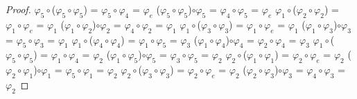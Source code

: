 \documentclass[10pt,a4paper,oneside]{article}
\begin{document}
\begin{proof}
				\newline
				$\varphi_{5}\circ$($\varphi_{5}\circ\varphi_{5}$) = $\varphi_{5}\circ\varphi_{4}$ = $\varphi_{e}$
				\newline
				($\varphi_{5}\circ\varphi_{5}$)$\circ\varphi_{5}$ = $\varphi_{4}\circ\varphi_{5}$ = $\varphi_{e}$
				\newline
				\newline
				$\varphi_{1}\circ$($\varphi_{2}\circ\varphi_{2}$) = $\varphi_{1}\circ\varphi_{e}$ = $\varphi_{1}$
				\newline
				($\varphi_{1}\circ\varphi_{2}$)$\circ\varphi_{2}$ = $\varphi_{4}\circ\varphi_{2}$ = $\varphi_{1}$
				\newline
				\newline
				$\varphi_{1}\circ$($\varphi_{3}\circ\varphi_{3}$) = $\varphi_{1}\circ\varphi_{e}$ = $\varphi_{1}$
				\newline
				($\varphi_{1}\circ\varphi_{3}$)$\circ\varphi_{3}$ = $\varphi_{5}\circ\varphi_{3}$ = $\varphi_{1}$
				\newline
				\newline
				$\varphi_{1}\circ$($\varphi_{4}\circ\varphi_{4}$) = $\varphi_{1}\circ\varphi_{5}$ = $\varphi_{3}$
				\newline
				($\varphi_{1}\circ\varphi_{4}$)$\circ\varphi_{4}$ = $\varphi_{2}\circ\varphi_{4}$ = $\varphi_{3}$
				\newline
				\newline
				$\varphi_{1}\circ$($\varphi_{5}\circ\varphi_{5}$) = $\varphi_{1}\circ\varphi_{4}$ = $\varphi_{2}$
				\newline
				($\varphi_{1}\circ\varphi_{5}$)$\circ\varphi_{5}$ = $\varphi_{3}\circ\varphi_{5}$ = $\varphi_{2}$
				\newline
				\newline
				$\varphi_{2}\circ$($\varphi_{1}\circ\varphi_{1}$) = $\varphi_{2}\circ\varphi_{e}$ = $\varphi_{2}$
				\newline
				($\varphi_{2}\circ\varphi_{1}$)$\circ\varphi_{1}$ = $\varphi_{5}\circ\varphi_{1}$ = $\varphi_{2}$
				\newline
				\newline
				$\varphi_{2}\circ$($\varphi_{3}\circ\varphi_{3}$) = $\varphi_{2}\circ\varphi_{e}$ = $\varphi_{2}$
				\newline
				($\varphi_{2}\circ\varphi_{3}$)$\circ\varphi_{3}$ = $\varphi_{4}\circ\varphi_{3}$ = $\varphi_{2}$
				\newline
				\newline

\end{proof}
\end{document}
